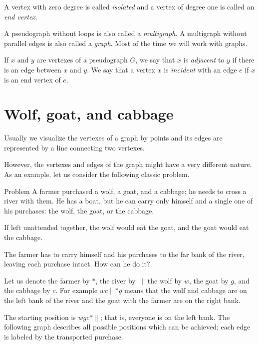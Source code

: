 A vertex with zero degree is called \emph{isolated} and a vertex of degree one is called an \emph{end vertex}.

\smallskip

A pseudograph without loops is also called a \emph{multigraph}.
A multigraph without parallel edges is also called a \emph{graph}.
Most of the time we will work with graphs.

If $x$ and $y$ are vertexes of a pseudograph $G$, we say that $x$ is \emph{adjacent} to $y$ if there is an edge between $x$ and $y$.
We say that a vertex $x$ is \emph{incident} with an edge $e$ if $x$ is an end vertex of $e$.

\section*{Wolf, goat, and cabbage}

Usually we visualize the vertexes of a graph by points
and its edges are represented by a line connecting two vertexes.

However, the vertexes and edges of the graph might have a very different nature.
As an example, let us consider the following classic problem.

\begin{thm}{Problem}
A farmer purchased a wolf, a goat, and a cabbage;
he needs to cross a river with them.
He has a boat, but he can carry only himself and a single one of his purchases: the wolf, the goat, or the cabbage.

If left unattended together, the wolf would eat the goat, and the goat would eat the cabbage.

The farmer has to carry himself and his purchases to the far bank of the river, leaving each purchase intact. How can he do it?
\end{thm}

Let us denote the farmer by $*$, the river by ${\parallel}$
the wolf by $w$, the goat by $g$, and the cabbage by $c$.
For example $wc{\parallel}{*}g$ means that the wolf and cabbage are on the left bank of the river and the goat with the farmer are on the right bank.

{\sloppy

The starting position is $wgc{*}{\parallel}$; that is, everyone is on the left bank.
The following graph describes all possible positions which can be achieved;
each edge is labeled by the transported purchase.

}

